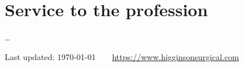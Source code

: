 \documentclass[12pt]{article} %
\begin{document}


























\section*{Service to the profession}

\ldots






\vfill %


\begin{center}
	\scriptsize
	Last updated: \today~~\raisebox{-0.5pt}{\textbullet}~~\href{https://www.higginsonsurgical.com}{https://www.higginsonsurgical.com}
\end{center}

\end{document}
